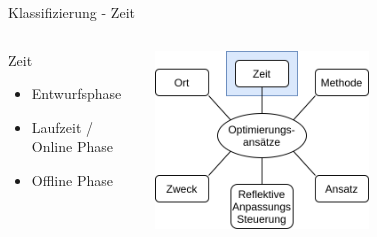 \documentclass[de,16:9]{sdqbeamer}
\begin{document}
\begin{frame}{Klassifizierung - Zeit}
	\begin{columns}
		 \begin{center}
			\begin{greenblock}{Zeit}
				\begin{itemize}
					\item Entwurfsphase
					\item Laufzeit / Online Phase
					\item Offline Phase
				\end{itemize}
			\end{greenblock}
		\end{center}
		 \begin{center}
			\includegraphics[width=0.6\textwidth]{sources/ClassificationProposal-Proposal_DE_Time.png}
		\end{center}
	\end{columns}
\end{frame}
\end{document}

